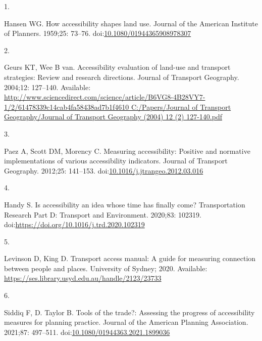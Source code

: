 \documentclass[10pt,letterpaper]{article}
\newlength{\cslhangindent}
\newlength{\csllabelwidth}
\newlength{\cslentryspacingunit} %
\newenvironment{CSLReferences}[2] %
 {%
  \setlength{\parindent}{0pt}
  \ifodd #1
  \let\oldpar\par
  \def\par{\hangindent=\cslhangindent\oldpar}
  \fi
  \setlength{\parskip}{#2\cslentryspacingunit}
 }%
 {}
\newcommand{\CSLLeftMargin}[1]{\parbox[t]{\csllabelwidth}{#1}}
\newcommand{\CSLRightInline}[1]{\parbox[t]{\linewidth - \csllabelwidth}{#1}\break}
\begin{document}
\hypertarget{refs}{}
\begin{CSLReferences}{0}{0}
\leavevmode{}%
\CSLLeftMargin{1. }%
\CSLRightInline{Hansen WG. How accessibility shapes land use. Journal of
the American Institute of Planners. 1959;25: 73--76.
doi:\href{https://doi.org/10.1080/01944365908978307}{10.1080/01944365908978307}}

\leavevmode{}%
\CSLLeftMargin{2. }%
\CSLRightInline{Geurs KT, Wee B van. Accessibility evaluation of
land-use and transport strategies: Review and research directions.
Journal of Transport Geography. 2004;12: 127--140. Available:
\href{http://www.sciencedirect.com/science/article/B6VG8-4B28VY7-1/2/61478339c14cab4fa58438ad7b1f4610\%0AC:/Papers/Journal\%20of\%20Transport\%20Geography/Journal\%20of\%20Transport\%20Geography\%20(2004)\%2012\%20(2)\%20127-140.pdf}{http://www.sciencedirect.com/science/article/B6VG8-4B28VY7-1/2/61478339c14cab4fa58438ad7b1f4610
C:/Papers/Journal of Transport Geography/Journal of Transport Geography
(2004) 12 (2) 127-140.pdf}}

\leavevmode{}%
\CSLLeftMargin{3. }%
\CSLRightInline{Paez A, Scott DM, Morency C. Measuring accessibility:
Positive and normative implementations of various accessibility
indicators. Journal of Transport Geography. 2012;25: 141--153.
doi:\href{https://doi.org/10.1016/j.jtrangeo.2012.03.016}{10.1016/j.jtrangeo.2012.03.016}}

\leavevmode{}%
\CSLLeftMargin{4. }%
\CSLRightInline{Handy S. Is accessibility an idea whose time has finally
come? Transportation Research Part D: Transport and Environment.
2020;83: 102319. doi:\url{https://doi.org/10.1016/j.trd.2020.102319}}

\leavevmode{}%
\CSLLeftMargin{5. }%
\CSLRightInline{Levinson D, King D. Transport access manual: {A} guide
for measuring connection between people and places. {University of
Sydney}; 2020. Available:
\url{https://ses.library.usyd.edu.au/handle/2123/23733}}

\leavevmode{}%
\CSLLeftMargin{6. }%
\CSLRightInline{Siddiq F, D. Taylor B. Tools of the trade?: Assessing
the progress of accessibility measures for planning practice. Journal of
the American Planning Association. 2021;87: 497--511.
doi:\href{https://doi.org/10.1080/01944363.2021.1899036}{10.1080/01944363.2021.1899036}}


\end{CSLReferences}
\end{document}
